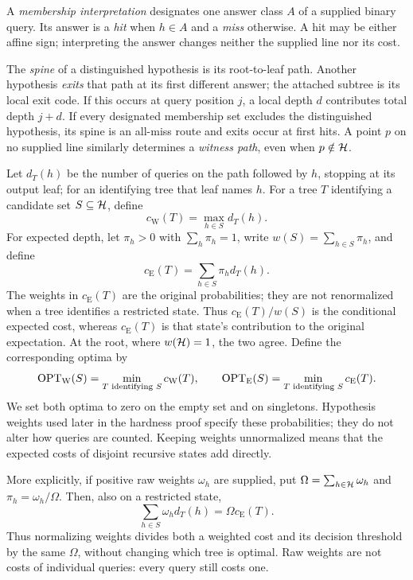 \begin{definition}\label{def:membership-spine}
A \emph{membership interpretation} designates one answer class $A$
of a supplied binary query. Its answer is a \emph{hit} when $h\in A$
and a \emph{miss} otherwise. A hit may be either affine sign;
interpreting the answer changes neither the supplied line nor its cost.

The \emph{spine} of a distinguished hypothesis is its root-to-leaf
path. Another hypothesis \emph{exits} that path at its first
different answer; the attached subtree is its local exit code.
If this occurs at query position $j$, a local depth $d$ contributes
total depth $j+d$.
If every designated membership set excludes the distinguished
hypothesis, its spine is an all-miss route and exits occur at first hits.
A point $p$ on no supplied line similarly determines a
\emph{witness path}, even when $p\notin\mathcal H$.
\end{definition}

Let $d_T(h)$ be the number of queries on the path followed by $h$,
stopping at its output leaf; for an identifying tree that leaf names $h$.
For a tree $T$ identifying a candidate set $S\subseteq\mathcal H$, define
\[
 c_{\mathrm W}(T)=\max_{h\in S}d_T(h).
\]
For expected depth, let $\pi_h>0$ with $\sum_h\pi_h=1$, write
$w(S)=\sum_{h\in S}\pi_h$, and define
\[
 c_{\mathrm E}(T)=\sum_{h\in S}\pi_h d_T(h).
\]
The weights in $c_{\mathrm E}(T)$ are the original probabilities;
they are not renormalized when a tree identifies a restricted state.
Thus $c_{\mathrm E}(T)/w(S)$ is the conditional expected cost,
whereas $c_{\mathrm E}(T)$ is that state's contribution to the
original expectation. At the root, where $w(\mathcal H)=1$, the two agree.
Define the corresponding optima by
\[
 \operatorname{OPT}_{\mathrm W}(S)=\min_{T\text{ identifying }S}c_{\mathrm W}(T),
 \qquad
 \operatorname{OPT}_{\mathrm E}(S)=\min_{T\text{ identifying }S}c_{\mathrm E}(T).
\]
We set both optima to zero on the empty set and on singletons.
Hypothesis weights used later in the hardness proof specify these
probabilities; they do not alter how queries are counted. Keeping
weights unnormalized means that the expected costs of disjoint
recursive states add directly.

More explicitly, if positive raw weights $\omega_h$ are supplied,
put $\Omega=\sum_{h\in\mathcal H}\omega_h$ and $\pi_h=\omega_h/\Omega$.
Then, also on a restricted state,
\[
 \sum_{h\in S}\omega_h d_T(h)=\Omega c_{\mathrm E}(T).
\]
Thus normalizing weights divides both a weighted cost and its
decision threshold by the same $\Omega$, without changing which
tree is optimal. Raw weights are not costs of individual queries:
every query still costs one.

